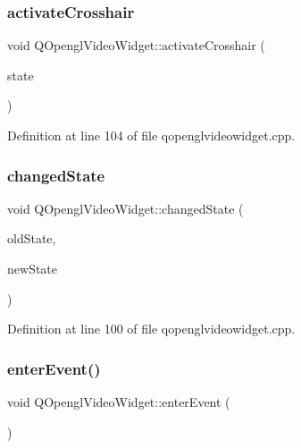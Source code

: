 \subsubsection{\texorpdfstring{activateCrosshair}{activateCrosshair}}
{\footnotesize\ttfamily void Q\+Opengl\+Video\+Widget\+::activate\+Crosshair (\begin{DoxyParamCaption}\item[{bool}]{state }\end{DoxyParamCaption})\hspace{0.3cm}{\ttfamily [slot]}}



Definition at line 104 of file qopenglvideowidget.\+cpp.

\mbox{\label{class_q_opengl_video_widget_a4f024f71a8de0fe02723afed8388ffb1}} 
\subsubsection{\texorpdfstring{changedState}{changedState}}
{\footnotesize\ttfamily void Q\+Opengl\+Video\+Widget\+::changed\+State (\begin{DoxyParamCaption}\item[{Qt\+::\+Window\+States}]{old\+State,  }\item[{Qt\+::\+Window\+States}]{new\+State }\end{DoxyParamCaption})\hspace{0.3cm}{\ttfamily [slot]}}



Definition at line 100 of file qopenglvideowidget.\+cpp.

\mbox{\label{class_q_opengl_video_widget_a7742313ffd8e43af717677a630563451}} 
\subsubsection{\texorpdfstring{enterEvent()}{enterEvent()}}
{\footnotesize\ttfamily void Q\+Opengl\+Video\+Widget\+::enter\+Event (\begin{DoxyParamCaption}\item[{Q\+Event $\ast$}]{ }\end{DoxyParamCaption})\hspace{0.3cm}{\ttfamily [protected]}}



